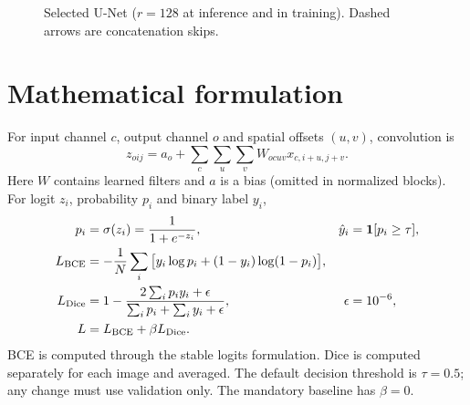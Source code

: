 \documentclass[11pt,a4paper]{article}
\begin{document}
\begin{figure}[htbp]\centering
{}
\caption{Selected U-Net ($r=128$ at inference and in training). Dashed arrows are concatenation skips.}
\end{figure}


\section{Mathematical formulation}
For input channel $c$, output channel $o$ and spatial offsets $(u,v)$, convolution is
\begin{equation}
z_{oij}=a_o+\sum_c\sum_u\sum_v W_{ocuv}x_{c,i+u,j+v}.
\end{equation}
Here $W$ contains learned filters and $a$ is a bias (omitted in normalized blocks). For logit $z_i$, probability $p_i$ and binary label $y_i$,
\begin{align}
p_i&=\sigma(z_i)=\frac{1}{1+e^{-z_i}}, & \hat y_i&=\mathbf1[p_i\ge\tau],\\
L_{\rm BCE}&=-\frac1N\sum_i\big[y_i\log p_i+(1-y_i)\log(1-p_i)\big],\\
L_{\rm Dice}&=1-\frac{2\sum_i p_iy_i+\epsilon}{\sum_i p_i+\sum_i y_i+\epsilon}, & \epsilon&=10^{-6},\\
L&=L_{\rm BCE}+\beta L_{\rm Dice}.
\end{align}
BCE is computed through the stable logits formulation. Dice is computed separately for each image and averaged. The default decision threshold is $\tau=0.5$; any change must use validation only. The mandatory baseline has $\beta=0$.
\end{document}
